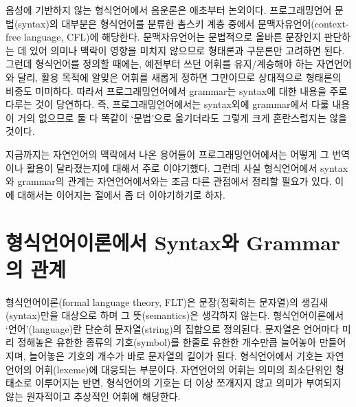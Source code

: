 음성에 기반하지 않는 형식언어에서 음운론은 애초부터 논외이다.
프로그래밍언어 문법(syntax)의 대부분은 형식언어를 분류한 촘스키 계층
중에서 문맥자유언어(context-free language, CFL)에 해당한다.
문맥자유언어는 문법적으로 올바른 문장인지 판단하는 데 있어 의미나 맥락이
영향을 미치지 않으므로 형태론과 구문론만 고려하면 된다. 그런데 형식언어를
정의할 때에는, 예전부터 쓰던 어휘를 유지/계승해야 하는 자연언어와 달리, 
활용 목적에 알맞은 어휘를 새롭게 정하면 그만이므로 상대적으로 형태론의
비중도 미미하다. 따라서 프로그래밍언어에서 grammar는 syntax에 대한 내용을
주로 다루는 것이 당연하다. 즉, 프로그래밍언어에서는 syntax외에 grammar에서
다룰 내용이 거의 없으므로 둘 다 똑같이 `문법'으로 옮기더라도 그렇게 크게
혼란스럽지는 않을 것이다.

지금까지는 자연언어의 맥락에서 나온 용어들이 프로그래밍언어에서는 어떻게
그 번역이나 활용이 달라졌는지에 대해서 주로 이야기했다. 그런데 사실
형식언어에서 syntax와 grammar의 관계는 자연언어에서와는 조금 다른 관점에서
정리할 필요가 있다. 이에 대해서는 이어지는 절에서 좀 더 이야기하기로 하자.

\section{형식언어이론에서 Syntax와 Grammar의 관계}
\label{sec:FormalLangSG}
%
%
%
%
%
%
%
%
형식언어이론(formal language theory, FLT)은 문장(정확히는 문자열)의 생김새(syntax)만을
대상으로 하며 그 뜻(semantics)은 생각하지 않는다. 형식언어이론에서
%
%
`언어'(language)란 단순히
%
%
문자열(string)의 집합으로 정의된다. 문자열은 언어마다 미리 정해놓은 유한한 종류의
기호(symbol)를 한줄로 유한한 개수만큼 늘어놓아 만들어지며, 늘어놓은 기호의 개수가
바로 문자열의 길이가 된다. 형식언어에서 기호는 자연언어의
%
%
어휘(lexeme)에 대응되는 부분이다.
자연언어의 어휘는 의미의 최소단위인 형태소로 이루어지는 반면,
형식언어의 기호는 더 이상 쪼개지지 않고 의미가 부여되지 않는
원자적이고 추상적인 어휘에 해당한다.

